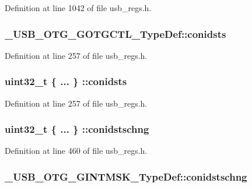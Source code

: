Definition at line 1042 of file usb\-\_\-regs.\-h.

\hypertarget{group___u_s_b___o_t_g___d_r_i_v_e_r_gaadfa38aac8be616468845b5ae918cd37}{
\subsubsection[{conidsts}]{ \-\_\-\-U\-S\-B\-\_\-\-O\-T\-G\-\_\-\-G\-O\-T\-G\-C\-T\-L\-\_\-\-Type\-Def\-::conidsts}}\label{group___u_s_b___o_t_g___d_r_i_v_e_r_gaadfa38aac8be616468845b5ae918cd37}


Definition at line 257 of file usb\-\_\-regs.\-h.

\hypertarget{group___u_s_b___o_t_g___d_r_i_v_e_r_gaa54de43edaee19da2e3f9f8c3ac1be6b}{
\subsubsection[{conidsts}]{\setlength{\rightskip}{0pt plus 5cm}uint32\-\_\-t \{ ... \} \-::conidsts}}\label{group___u_s_b___o_t_g___d_r_i_v_e_r_gaa54de43edaee19da2e3f9f8c3ac1be6b}


Definition at line 257 of file usb\-\_\-regs.\-h.

\hypertarget{group___u_s_b___o_t_g___d_r_i_v_e_r_gabdb1374375b7bc2a31434bb580d2af46}{
\subsubsection[{conidstschng}]{\setlength{\rightskip}{0pt plus 5cm}uint32\-\_\-t \{ ... \} \-::conidstschng}}\label{group___u_s_b___o_t_g___d_r_i_v_e_r_gabdb1374375b7bc2a31434bb580d2af46}


Definition at line 460 of file usb\-\_\-regs.\-h.

\hypertarget{group___u_s_b___o_t_g___d_r_i_v_e_r_ga4fcd5911c8b0577a0f7cdd626fb2cfb9}{
\subsubsection[{conidstschng}]{ \-\_\-\-U\-S\-B\-\_\-\-O\-T\-G\-\_\-\-G\-I\-N\-T\-M\-S\-K\-\_\-\-Type\-Def\-::conidstschng}}\label{group___u_s_b___o_t_g___d_r_i_v_e_r_ga4fcd5911c8b0577a0f7cdd626fb2cfb9}


